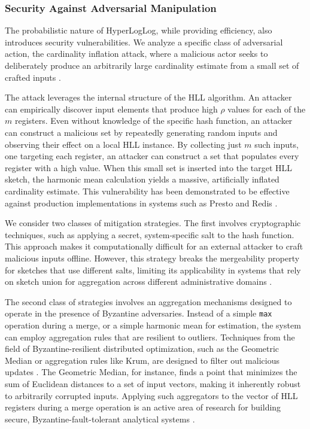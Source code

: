 
\subsubsection{Security Against Adversarial Manipulation} \label{subsubsec:hll-security}

The probabilistic nature of HyperLogLog, while providing efficiency, also introduces security vulnerabilities. We analyze a specific class of adversarial action, the cardinality inflation attack, where a malicious actor seeks to deliberately produce an arbitrarily large cardinality estimate from a small set of crafted inputs \cite{Reviriego2020HyperLogLogS}.

The attack leverages the internal structure of the HLL algorithm. An attacker can empirically discover input elements that produce high $\rho$ values for each of the $m$ registers. Even without knowledge of the specific hash function, an attacker can construct a malicious set by repeatedly generating random inputs and observing their effect on a local HLL instance. By collecting just $m$ such inputs, one targeting each register, an attacker can construct a set that populates every register with a high value. When this small set is inserted into the target HLL sketch, the harmonic mean calculation yields a massive, artificially inflated cardinality estimate. This vulnerability has been demonstrated to be effective against production implementations in systems such as Presto and Redis \cite{Reviriego2020HyperLogLogS}.

We consider two classes of mitigation strategies. The first involves cryptographic techniques, such as applying a secret, system-specific salt to the hash function. This approach makes it computationally difficult for an external attacker to craft malicious inputs offline. However, this strategy breaks the mergeability property for sketches that use different salts, limiting its applicability in systems that rely on sketch union for aggregation across different administrative domains \cite{Reviriego2020HyperLogLogS}.

The second class of strategies involves an aggregation mechanisms designed to operate in the presence of Byzantine adversaries. Instead of a simple \texttt{max} operation during a merge, or a simple harmonic mean for estimation, the system can employ aggregation rules that are resilient to outliers. Techniques from the field of Byzantine-resilient distributed optimization, such as the Geometric Median or aggregation rules like Krum, are designed to filter out malicious updates \cite{Le2025ByzantineRF}. The Geometric Median, for instance, finds a point that minimizes the sum of Euclidean distances to a set of input vectors, making it inherently robust to arbitrarily corrupted inputs. Applying such aggregators to the vector of HLL registers during a merge operation is an active area of research for building secure, Byzantine-fault-tolerant analytical systems \cite{Kuwaranancharoen2023OnTG}.

